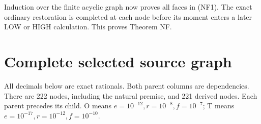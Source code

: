 Induction over the finite acyclic graph now proves all faces in (NF1). The exact ordinary restoration is completed at each node before its moment enters a later LOW or HIGH calculation. This proves Theorem NF.

\hypertarget{feedback:complete-selected-source-graph}{%
\section{Complete selected source graph}\label{feedback:complete-selected-source-graph}}

All decimals below are exact rationals. Both parent columns are dependencies. There are 222 nodes, including the natural premise, and 221 derived nodes. Each parent precedes its child. O means \(e=10^{-12},r=10^{-8},f=10^{-7}\); T means \(e=10^{-17},r=10^{-12},f=10^{-10}\).

